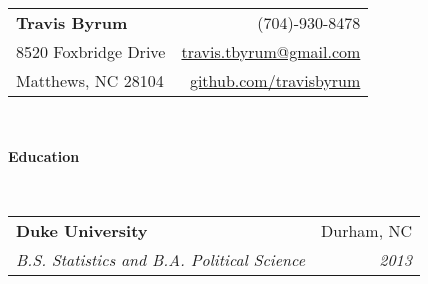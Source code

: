\documentclass[letterpaper,12pt]{article}
\makeatletter
\newcommand{\resheading}[1]{{\large \colorbox{mygrey}{\begin{minipage}{\textwidth}{\textbf{#1 \vphantom{p\^{E}}}}\end{minipage}}}}
\newcommand{\ressubheading}[4]{
\begin{tabular*}{6.9in}{l@{\extracolsep{\fill}}r}
		\textbf{#1} & #2 \\
		\textit{#3} & \textit{#4} \\
\end{tabular*}\vspace{-6pt}}
\makeatother
\begin{document}
\newcommand{\mywebheader}{
\begin{tabular*}{7in}{l@{\extracolsep{\fill}}r}
	\textbf{\Huge Travis Byrum}  & (704)-930-8478\\
	8520 Foxbridge Drive & \href{mailto:travis.tbyrum@gmail.com}{travis.tbyrum@gmail.com} \\
	Matthews, NC 28104 & \href{https://github.com/travisbyrum}{github.com/travisbyrum}\\
\end{tabular*}
\\
\vspace{0.1in}}

\mywebheader
\resheading{Education}
\\
			\ressubheading{Duke University}{Durham, NC}{B.S. Statistics and B.A. Political Science}{2013}
\end{document}
